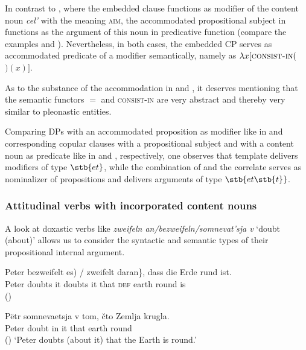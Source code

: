 \documentclass[output=paper]{langscibook}
\begin{document}
\noindent In contrast to , where the embedded clause functions as modifier of the content noun \textit{cel'} with the meaning \textsc{aim}, the accommodated propositional subject in  functions as the argument of this noun in predicative function (compare the examples  and ). Nevertheless, in both cases, the embedded CP serves as accommodated predicate of a modifier semantically, namely as $\lambda x [\textsc{consist-in} ($$) (x)]$.

As to the substance of the accommodation in  and , it deserves mentioning that the semantic functors $=$ and \textsc{consist-in} are very abstract and thereby very similar to pleonastic entities.

Comparing DPs with an accommodated proposition as modifier like in  and corresponding copular clauses with a propositional subject and with a content noun as predicate like in  and , respectively, one observes that template  delivers modifiers of type $\stb{et}$, while the combination of  and the correlate  serves as nominalizer of propositions and delivers arguments of type $\stb{et\stb{t}}$.


\subsubsection{Attitudinal verbs with incorporated content nouns}\label{s:2.4.2}

A look at doxastic verbs like \textit{zweifeln an/bezweifeln/somnevat'sja v} `doubt (about)' allows us to consider the syntactic and semantic types of their propositional internal argument.

\ea\label{ex:zimmermann:32}
    \ea \gll Peter \minsp{\{} bezweifelt \minsp{(} es) / zweifelt daran\}, dass die Erde rund ist. \\
    Peter {} doubts {} it {} doubts it that \textsc{def} earth round is \\ \glt \hfill ()

    \ex  \gll Pëtr somnevaetsja v tom, čto Zemlja krugla. \\
    Peter doubt in it that earth round \\ \hfill ()
    \z
    \glt `Peter doubts (about it) that the Earth is round.'
\z
\end{document}
